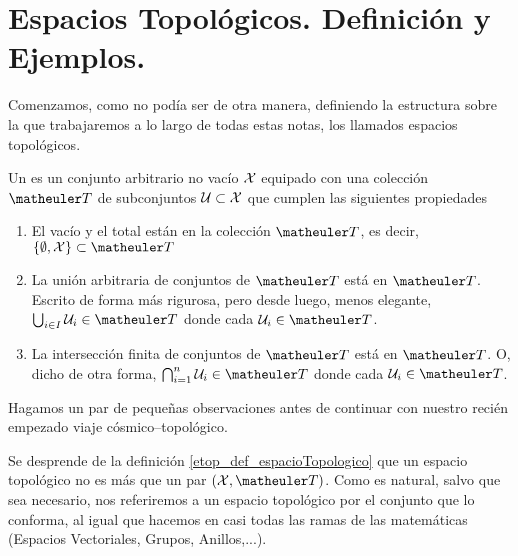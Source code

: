 \section{Espacios Topológicos. Definición y Ejemplos.}
\label{etop_definicionEjemplos}
Comenzamos, como no podía ser de otra manera, definiendo la estructura sobre la que trabajaremos a lo largo de todas estas notas, los llamados espacios topológicos.
\begin{defi}[Espacio Topológico]
	\label{etop_def_espacioTopologico}
	Un  es un conjunto arbitrario no vacío $\mathcal{X}$ equipado con una colección $\T$ de subconjuntos $\mathcal{U}\subset\mathcal{X}$ que cumplen las siguientes propiedades
	\begin{enumerate}
		\item[\tb{T1}] El vacío y el total están en la colección $\T$, es decir, $\{\emptyset, \X\} \subset \T$
		\item[\tb{T2}] La unión arbitraria de conjuntos de $\T$ está en $\T$. Escrito de forma más rigurosa, pero desde luego, menos elegante, 
		$\bigcup_{i\in I}\U_i\in\T$ donde cada $\U_i\in\T$.
		\item[\tb{T3}] La intersección finita de conjuntos de $\T$ está en $\T$. O, dicho de otra forma, $\bigcap_{i=1}^{n}\U_i\in\T$ donde cada $\U_i\in\T$.
	\end{enumerate}
\end{defi}
Hagamos un par de pequeñas observaciones antes de continuar con nuestro recién empezado viaje cósmico--topológico.
\begin{obs}[Sutilezas]
	\label{etop_obs_sutilezas}
	Se desprende de la definición \ref{etop_def_espacioTopologico} que un espacio topológico no es más que un par $(\X, \T)$. Como es natural, salvo que sea necesario, nos referiremos a un espacio topológico por el conjunto que lo conforma, al igual que hacemos en casi todas las ramas de las matemáticas (Espacios Vectoriales, Grupos, Anillos,...).
\end{obs}
